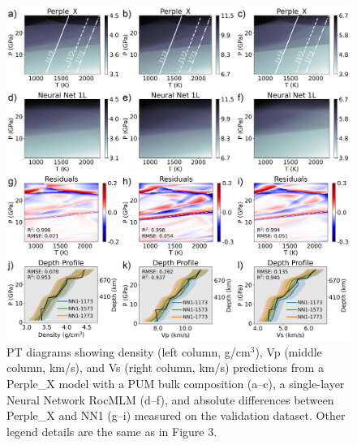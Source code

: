 \documentclass[draft,linenumbers]{agujournal2018}
\begin{document}
\begin{figure}[htbp]

{\centering \includegraphics[width=1\linewidth,]{image12-PUM-NN1} 

}

\caption{PT diagrams showing density (left column, g/cm\(^3\)), Vp (middle column, km/s), and Vs (right column, km/s) predictions from a Perple\_X model with a PUM bulk composition (a--c), a single-layer Neural Network RocMLM (d--f), and absolute differences between Perple\_X and NN1 (g--i) measured on the validation dataset. Other legend details are the same as in Figure 3.}\label{fig:image12-PUM-NN1}
\end{figure}
\end{document}
